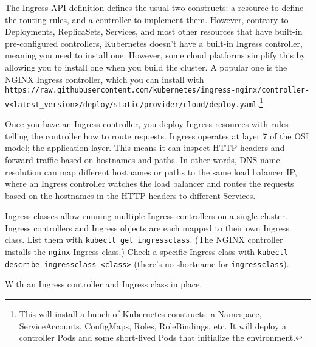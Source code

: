 \documentclass[8pt, table, xcdraw]{article}%
\begin{document}
The Ingress API definition defines the usual two constructs: a resource to define the routing rules, and a controller to implement them. However, contrary to Deployments, ReplicaSets, Services, and most other resources that have built-in pre-configured controllers, Kubernetes doesn’t have a built-in Ingress controller, meaning you need to install one. However, some cloud platforms simplify this by allowing you to install one when you build the cluster. A popular one is the NGINX Ingress controller, which you can install with \lstinline{https://raw.githubusercontent.com/kubernetes/ingress-nginx/controller-v<latest_version>/deploy/static/provider/cloud/deploy.yaml}.\footnote{This will install a bunch of Kubernetes constructs: a Namespace, ServiceAccounts, ConfigMaps, Roles, RoleBindings, etc. It will deploy a controller Pods and some short-lived Pods that initialize the environment.}

Once you have an Ingress controller, you deploy Ingress resources with rules telling the controller how to route requests. Ingress operates at layer 7 of the OSI model; the application layer. This means it can inspect HTTP headers and forward traffic based on hostnames and paths. In other words, DNS name resolution can map different hostnames or paths to the same load balancer IP, where an Ingress controller watches the load balancer and routes the requests based on the hostnames in the HTTP headers to different Services.

Ingress classes allow running multiple Ingress controllers on a single cluster. Ingress controllers and Ingress objects are each mapped to their own Ingress class. List them with \lstinline{kubectl get ingressclass}. (The NGINX controller installs the \lstinline{nginx} Ingress class.) Check a specific Ingress class with \lstinline{kubectl describe ingressclass <class>} (there's no shortname for \lstinline{ingressclass}).

With an Ingress controller and Ingress class in place, 
\end{document}
